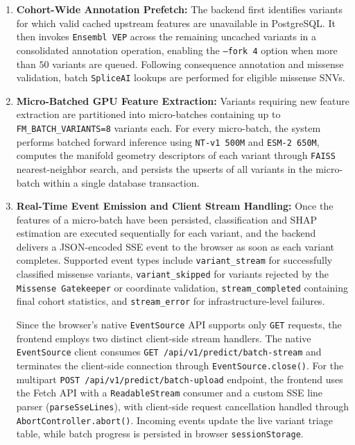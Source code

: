 \begin{enumerate}
    \item \textbf{Cohort-Wide Annotation Prefetch:} The backend first identifies variants for which valid cached upstream features are unavailable in PostgreSQL. It then invokes \texttt{Ensembl VEP} across the remaining uncached variants in a consolidated annotation operation, enabling the \texttt{--fork 4} option when more than $50$ variants are queued. Following consequence annotation and missense validation, batch \texttt{SpliceAI} lookups are performed for eligible missense SNVs.

    \item \textbf{Micro-Batched GPU Feature Extraction:} Variants requiring new feature extraction are partitioned into micro-batches containing up to \texttt{FM\_BATCH\_VARIANTS=8} variants each. For every micro-batch, the system performs batched forward inference using \texttt{NT-v1 500M} and \texttt{ESM-2 650M}, computes the manifold geometry descriptors of each variant through \texttt{FAISS} nearest-neighbor search, and persists the upserts of all variants in the micro-batch within a single database transaction.

    \item \textbf{Real-Time Event Emission and Client Stream Handling:} Once the features of a micro-batch have been persisted, classification and SHAP estimation are executed sequentially for each variant, and the backend delivers a JSON-encoded SSE event to the browser as soon as each variant completes. Supported event types include \texttt{variant\_stream} for successfully classified missense variants, \texttt{variant\_skipped} for variants rejected by the \texttt{Missense Gatekeeper} or coordinate validation, \texttt{stream\_completed} containing final cohort statistics, and \texttt{stream\_error} for infrastructure-level failures.

    Since the browser's native \texttt{EventSource} API supports only \texttt{GET} requests, the frontend employs two distinct client-side stream handlers. The native \texttt{EventSource} client consumes \texttt{GET /api/v1/predict/batch-stream} and terminates the client-side connection through \texttt{EventSource.close()}. For the multipart \texttt{POST /api/v1/predict/batch-upload} endpoint, the frontend uses the Fetch API with a \texttt{ReadableStream} consumer and a custom SSE line parser (\texttt{parseSseLines}), with client-side request cancellation handled through \texttt{AbortController.abort()}. Incoming events update the live variant triage table, while batch progress is persisted in browser \texttt{sessionStorage}.
\end{enumerate}

